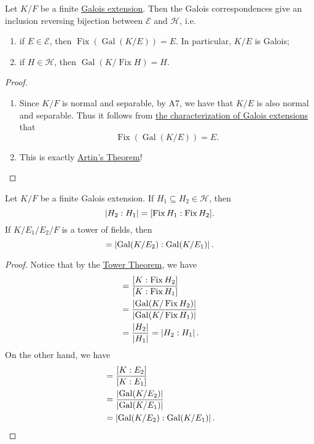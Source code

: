 \documentclass[notoc,notitlepage,nobib]{tufte-book}
\DeclareMathOperator{\Gal}{Gal}
\DeclareMathOperator{\Fix}{Fix}
\begin{document}
\begin{thm}\label{thm:fundamental_theorem_of_galois_theory}
  Let $K / F$ be a finite \hyperref[defn:galois_extension]{Galois extension}.
  Then the Galois correspondences give an inclusion reversing bijection between
  $\mathcal{E}$ and $\mathcal{H}$, i.e.
  \begin{enumerate}
    \item if $E \in \mathcal{E}$, then $\Fix (\Gal(K / E)) = E$. In particular,
      $K / E$ is Galois;
    \item if $H \in \mathcal{H}$, then $\Gal(K / \Fix H) = H$.
  \end{enumerate}
\end{thm}

\begin{proof}
  \begin{enumerate}
    \item Since $K / F$ is normal and separable, by A7, we have that $K / E$ is
      also normal and separable. Thus it follows from
      \hyperref[thm:characterization_of_galois_extensions]{the characterization
      of Galois extensions} that
      \begin{equation*}
        \Fix(\Gal(K / E)) = E.
      \end{equation*}
    \item This is exactly \hyperref[thm:artin_s_theorem]{Artin's Theorem}!
  \end{enumerate}
\end{proof}

\begin{crly}\label{crly:relation_between_index_and_degree}
  Let $K / F$ be a finite Galois extension. If $H_1 \subseteq H_2 \in
  \mathcal{H}$, then
  \begin{equation*}
    \abs{ H_2 : H_1 } = [ \Fix H_1 : \Fix H_2 ].
  \end{equation*}
  If $K / E_1 / E_2 / F$ is a tower of fields, then
  \begin{equation*}
    [ E_1 : E_2 ] = \abs{ \Gal(K / E_2) : \Gal(K / E_1) }.
  \end{equation*}
\end{crly}

\begin{proof}
  Notice that by the \hyperref[thm:tower_theorem]{Tower Theorem}, we have
  \begin{align*}
    [ \Fix H_1 : \Fix H_2 ]
    &= \frac{[ K : \Fix H_2 ]}{[ K : \Fix H_1 ]} \\
    &= \frac{\abs{\Gal(K / \Fix H_2)}}{\abs{\Gal(K / \Fix H_1)}} \\
    &= \frac{\abs{H_2}}{\abs{H_1}} = \abs{ H_2 : H_1 }.
  \end{align*}
  On the other hand, we have
  \begin{align*}
    [ E_1 : E_2 ]
    &= \frac{[ K : E_2 ]}{[ K : E_1 ]} \\
    &= \frac{\abs{\Gal(K / E_2)}}{\abs{\Gal(K / E_1)}} \\
    &= \abs{\Gal(K / E_2) : \Gal(K / E_1)}.
  \end{align*}
\end{proof}
\end{document}
